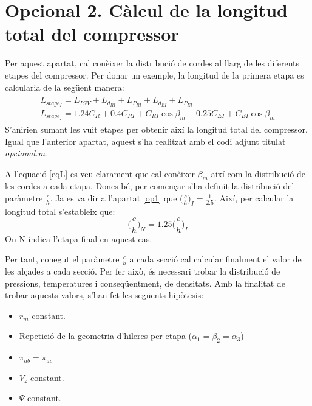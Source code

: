 \section{Opcional 2. Càlcul de la longitud total del compressor}
\label{op2}
Per aquest apartat, cal conèixer la distribució de cordes al llarg de les diferents etapes del compressor.
Per donar un exemple, la longitud de la primera etapa es calcularia de la següent manera:
\begin{align}
\label{eqL}
\begin{split}
L_{stage_I} = L_{IGV} + L_{d_{RI}} + L_{P_{RI}} + L_{d_{EI}} +  L_{P_{EI}}  \\
L_{stage_I} = 1.24C_{R} + 0.4C_{RI} + C_{RI}\cos{\beta_m} + 0.25C_{EI} + C_{EI}\cos{\beta_m}
\end{split}
\end{align}
S'anirien sumant les vuit etapes per obtenir així la longitud total del compressor. Igual que l'anterior apartat, aquest s'ha realitzat amb el codi adjunt titulat \textit{opcional.m}.

A l'equació \ref{eqL} es veu clarament que cal conèixer $\beta_m$ així com la distribució de les cordes a cada etapa. Doncs bé, per començar s'ha definit la distribució del paràmetre $\frac{c}{h}$. Ja es va dir a l'apartat \ref{op1} que $\Big(\frac{c}{h}\Big)_I = \frac{1}{2.5}$. Així, per calcular la longitud total s'estableix que:
\begin{equation}
\Big(\frac{c}{h}\Big)_N = 1.25\Big(\frac{c}{h}\Big)_I
\end{equation}
On N indica l'etapa final en aquest cas.

Per tant, conegut el paràmetre $\frac{c}{h}$ a cada secció cal calcular finalment el valor de les alçades a cada secció. Per fer això, és necessari trobar la distribució de pressions, temperatures i conseqüentment, de densitats. Amb la finalitat de trobar aquests valors, s'han fet les següents hipòtesis:

\begin{itemize}
\item $r_m$ constant.
\item Repetició de la geometria d'hileres per etapa ($\alpha_1 = \beta_2 = \alpha_3$)
\item $\pi_{ab} = \pi_{ac}$
\item $V_z$ constant.
\item $\Psi$ constant.
\end{itemize}

